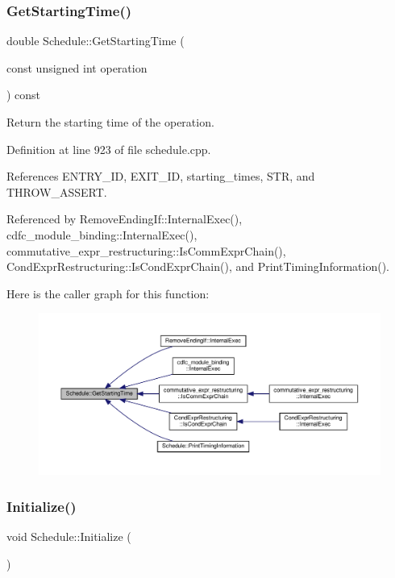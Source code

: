 \subsubsection{\texorpdfstring{Get\+Starting\+Time()}{GetStartingTime()}}
{\footnotesize\ttfamily double Schedule\+::\+Get\+Starting\+Time (\begin{DoxyParamCaption}\item[{const unsigned int}]{operation }\end{DoxyParamCaption}) const}



Return the starting time of the operation. 



Definition at line 923 of file schedule.\+cpp.



References E\+N\+T\+R\+Y\+\_\+\+ID, E\+X\+I\+T\+\_\+\+ID, starting\+\_\+times, S\+TR, and T\+H\+R\+O\+W\+\_\+\+A\+S\+S\+E\+RT.



Referenced by Remove\+Ending\+If\+::\+Internal\+Exec(), cdfc\+\_\+module\+\_\+binding\+::\+Internal\+Exec(), commutative\+\_\+expr\+\_\+restructuring\+::\+Is\+Comm\+Expr\+Chain(), Cond\+Expr\+Restructuring\+::\+Is\+Cond\+Expr\+Chain(), and Print\+Timing\+Information().

Here is the caller graph for this function\+:
\nopagebreak
\begin{figure}[H]
\begin{center}
\leavevmode
\includegraphics[width=350pt]{df/d61/classSchedule_ac2e233f2734b8d91805a4a51e3bd3246_icgraph}
\end{center}
\end{figure}
\mbox{\label{classSchedule_ae081e822e8e894d32cb3a0e991c31889}} 
\subsubsection{\texorpdfstring{Initialize()}{Initialize()}}
{\footnotesize\ttfamily void Schedule\+::\+Initialize (\begin{DoxyParamCaption}{ }\end{DoxyParamCaption})}



